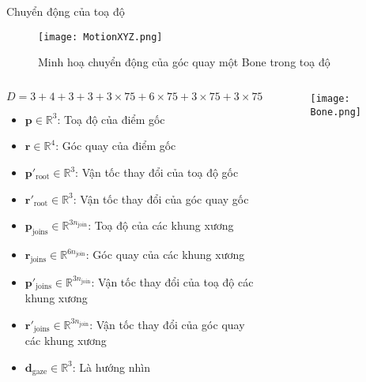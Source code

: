 \begin{frame}{Chuyển động của toạ độ}
		\begin{figure}
		\centering
		\texttt{[image: MotionXYZ.png]}
		\caption{Minh hoạ chuyển động của góc quay một Bone trong toạ độ}
	\end{figure}
	\vspace{-15pt}
	\begin{columns}
		\begin{column}{0.78\textwidth}
			$$
			D = 3 + 4 + 3 + 3 + 3 \times 75 + 6 \times 75 + 3 \times 75 + 3 \times 75 + 3
			$$
			\vspace{-20pt}
			\begin{itemize}
				\item $\mathbf{p} \in \mathbb{R}^3$: Toạ độ của điểm gốc
				\item $\mathbf{r} \in \mathbb{R}^4$: Góc quay của điểm gốc
				\item $\mathbf{p}'_{\text{root}} \in \mathbb{R}^3$: Vận tốc thay đổi của toạ độ gốc
				\item $\mathbf{r}'_{\text{root}} \in \mathbb{R}^3$: Vận tốc thay đổi của góc quay gốc
				
				\item $\mathbf{p}_{\text{joins}} \in \mathbb{R}^{3 n_{\text{join} }}$: Toạ độ của các khung xương
				\item $\mathbf{r}_{\text{joins}} \in \mathbb{R}^{6 n_{\text{join} }}$: Góc quay của các khung xương
				\item $\mathbf{p}'_{\text{joins}} \in \mathbb{R}^{3n_{\text{join} }}$: Vận tốc thay đổi của toạ độ các khung xương
				\item $\mathbf{r}'_{\text{joins}} \in \mathbb{R}^{3n_{\text{join} }}$: Vận tốc thay đổi của góc quay các khung xương
				
				\item $\mathbf{d}_{\text{gaze}} \in \mathbb{R}^3$: Là hướng nhìn
			\end{itemize}
		\end{column}
		
		\begin{column}{0.22\textwidth}
			\vspace{12pt}
			\begin{figure}
				\centering
				\texttt{[image: Bone.png]}
			\end{figure}
			
		\end{column}
	\end{columns}
	
\end{frame}

